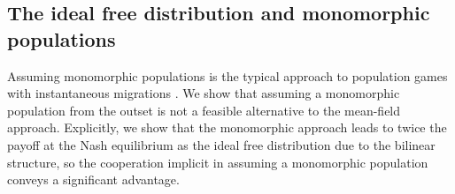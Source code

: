 \subsection{The ideal free distribution and monomorphic populations}
Assuming monomorphic populations is the typical approach to population games with instantaneous migrations  \citep{kvrivan2013behavioral, vincent2005evolutionary}. We show that assuming a monomorphic population from the outset is not a feasible alternative to the mean-field approach. Explicitly, we show that the monomorphic approach leads to twice the payoff at the Nash equilibrium as the ideal free distribution due to the bilinear structure, so the cooperation implicit in assuming a monomorphic population conveys a significant advantage.



